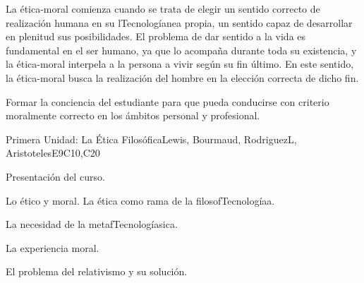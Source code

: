 \begin{syllabus}


\begin{justification}
La ética-moral comienza cuando se trata de elegir un sentido correcto de realización humana en su lTecnologíanea propia, un sentido capaz de desarrollar en plenitud sus posibilidades.
El problema de dar sentido a la vida es fundamental en el ser humano, ya que lo acompaña durante toda su existencia, y la ética-moral interpela a la persona a vivir según su fin último. En este sentido, la ética-moral busca la realización del hombre en la elección correcta de dicho fin.
\end{justification}

\begin{goals}
\item Formar la conciencia del estudiante para que pueda conducirse con criterio moralmente correcto en los ámbitos personal y profesional.

\end{goals}

\begin{outcomes}
    \item {}
    \item {}
\end{outcomes}

\begin{competences}
    \item {}
    \item {}
    \item {}
    \item {}
\end{competences}

\begin{unit}{}{Primera Unidad: La Ética Filosófica}{Lewis, Bourmaud, RodriguezL, AristotelesE}{9}{C10,C20}
\begin{topics}
    \item Presentación del curso.
    \item Lo ético y moral. La ética como rama de la filosofTecnologíaa.
    \item La necesidad de la metafTecnologíasica.
    \item La experiencia moral.
    \item El problema del relativismo y su solución.
	

\end{topics}
\end{unit}
\end{syllabus}
